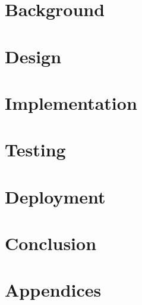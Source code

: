 \part{Background}




\part{Design}





\part{Implementation}


\part{Testing}


\part{Deployment}


\part{Conclusion}




\part{Appendices}


